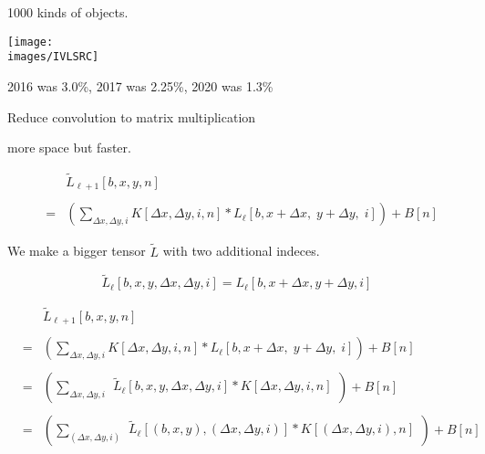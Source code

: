 {

1000 kinds of objects.

\vfill
\centerline{\texttt{[image: \\images/IVLSRC]}}
2016 was 3.0\%, 2017 was  2.25\%, 2020 was 1.3\%
 


Reduce convolution to matrix multiplication

\vfill
more space but faster.

\vfill
\begin{eqnarray*}
  & & \tilde{L}_{{\ell+1}}[b,x,y,n] \\
  \\
  & = & \left(\sum_{\Delta x, \Delta y, i} K[\Delta x, \Delta y, i, n] *L_{{\ell}}[b,x + \Delta x,\; y + \Delta y,\; i]\right) + B[n]
  \end{eqnarray*}

\vfill
We make a bigger tensor $\tilde{L}$ with two additional indeces.

$$\tilde{L}_{{\ell}}[b,x,y,\Delta x,\Delta y,i] = L_{{\ell}}[b,x+\Delta x,y+\Delta y,i]$$


\begin{eqnarray*}
  & & \tilde{L}_{{\ell+1}}[b,x,y,n] \\
  \\
  & = & \left(\sum_{\Delta x, \Delta y, i} K[\Delta x, \Delta y, i, n] *L_{{\ell}}[b,x + \Delta x,\; y + \Delta y,\; i]\right) + B[n] \\
  \\
      & = & \left(\sum_{\Delta x, \Delta y, i} \begin{array}{l}
                                              \tilde{L}_{{\ell}}[b,x,y,\Delta x,\Delta y,i]
                                              * K[\Delta x, \Delta y, i, n] \\
  \end{array}\right) + B[n] \\
  \\
    & = & \left(\sum_{(\Delta x, \Delta y, i)} \begin{array}{l}
                                              \tilde{L}_{{\ell}}[(b,x,y),(\Delta x,\Delta y,i)]
                                              * K[(\Delta x, \Delta y, i), n] \\
                                           \end{array}\right) + B[n]
\end{eqnarray*}

}

